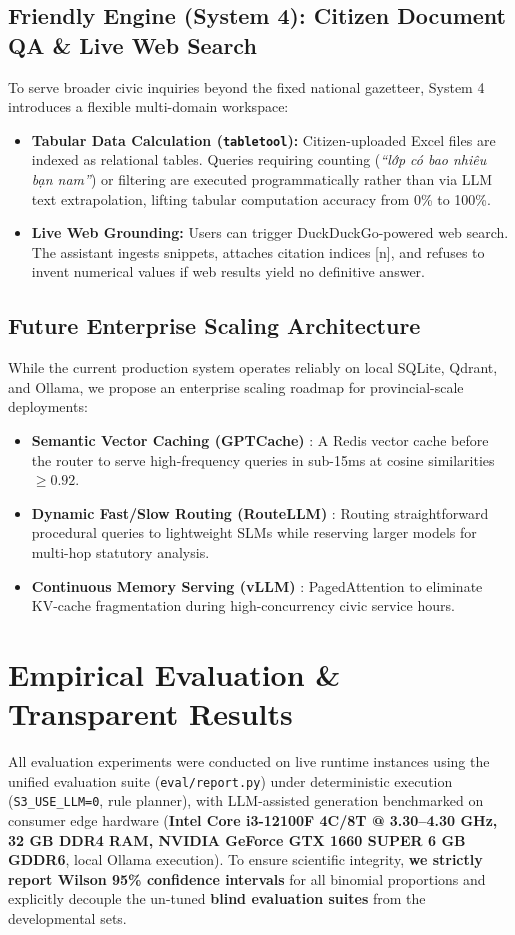 \documentclass[11pt,a4paper]{article}
\begin{document}
\subsection{Friendly Engine (System 4): Citizen Document QA \& Live Web Search}
To serve broader civic inquiries beyond the fixed national gazetteer, System 4 introduces a flexible
multi-domain workspace:
\begin{itemize}
\item \textbf{Tabular Data Calculation (\texttt{tabletool}):} Citizen-uploaded Excel files are indexed as
relational tables. Queries requiring counting (\emph{``lớp có bao nhiêu bạn nam''}) or filtering are
executed programmatically rather than via LLM text extrapolation, lifting tabular computation accuracy
from 0\% to 100\%.
\item \textbf{Live Web Grounding:} Users can trigger DuckDuckGo-powered web search. The assistant ingests
snippets, attaches citation indices [n], and refuses to invent numerical values if web results yield no
definitive answer.
\end{itemize}

\subsection{Future Enterprise Scaling Architecture}
While the current production system operates reliably on local SQLite, Qdrant, and Ollama, we propose an
enterprise scaling roadmap for provincial-scale deployments:
\begin{itemize}
\item \textbf{Semantic Vector Caching (GPTCache)} \cite{gptcache}: A Redis vector cache before the router
to serve high-frequency queries in sub-15ms at cosine similarities $\ge 0.92$.
\item \textbf{Dynamic Fast/Slow Routing (RouteLLM)} \cite{routellm}: Routing straightforward procedural
queries to lightweight SLMs while reserving larger models for multi-hop statutory analysis.
\item \textbf{Continuous Memory Serving (vLLM)} \cite{vllm}: PagedAttention to eliminate KV-cache
fragmentation during high-concurrency civic service hours.
\end{itemize}

\section{Empirical Evaluation \& Transparent Results}
All evaluation experiments were conducted on live runtime instances using the unified evaluation suite
(\texttt{eval/report.py}) under deterministic execution (\texttt{S3\_USE\_LLM=0}, rule planner), with
LLM-assisted generation benchmarked on consumer edge hardware (\textbf{Intel Core i3-12100F 4C/8T @
3.30--4.30 GHz, 32 GB DDR4 RAM, NVIDIA GeForce GTX 1660 SUPER 6 GB GDDR6}, local Ollama execution).
To ensure scientific integrity, \textbf{we strictly report Wilson 95\% confidence intervals} for all
binomial proportions and explicitly decouple the un-tuned \textbf{blind evaluation suites} from the
developmental sets.
\end{document}
